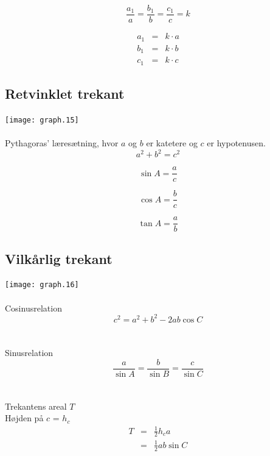 \documentclass[11pt,a5paper,fleqn,leqno]{book}
\begin{document}
\begin{equation}
\frac{a_1}{a} = \frac{b_1}{b} = \frac{c_1}{c} = k
\end{equation}

\begin{eqnarray}
a_1 & = & k \cdot a \\
b_1 & = & k \cdot b \nonumber \\
c_1 & = & k \cdot c \nonumber
\end{eqnarray}

\vfill

\subsection{Retvinklet trekant}

\texttt{[image: graph.15]}
\\
\\
Pythagoras' læresætning, hvor $a$ og $b$ er katetere og $c$ er hypotenusen.
\begin{equation} \label{eq:trekant_pythagoras}
a^2 + b^2 = c^2
\end{equation}

\begin{equation}
\sin A = \frac{a}{c}
\end{equation}

\begin{equation}
\cos A = \frac{b}{c}
\end{equation}

\begin{equation}
\tan A = \frac{a}{b}
\end{equation}

\vfill

\subsection{Vilkårlig trekant}

\texttt{[image: graph.16]}
\\
\\
Cosinusrelation
\begin{equation}
c^2 = a^2 + b^2 - 2ab\cos C
\end{equation}
\\
\\
Sinusrelation
\begin{equation}
\frac{a}{\sin A} = \frac{b}{\sin B} = \frac{c}{\sin C}
\end{equation}
\\
\\
Trekantens areal $T$ \\
Højden på $c$ = $h_c$
\begin{eqnarray}
T & = & \frac{1}{2}h_c a \\
& = & \frac{1}{2}ab\sin C \nonumber
\end{eqnarray}
\end{document}
